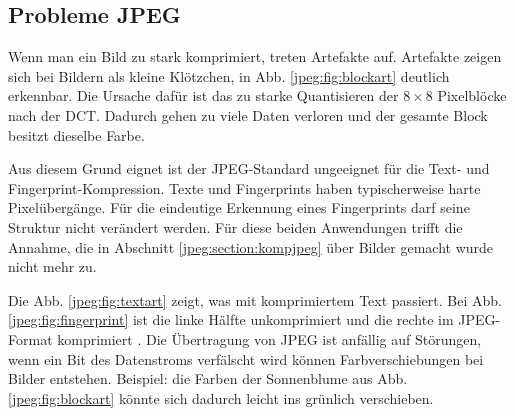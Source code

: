 \subsection{Probleme JPEG
\label{jpeg:subsection:probleme}}
Wenn man ein Bild zu stark komprimiert, treten Artefakte auf.
Artefakte zeigen sich bei Bildern als kleine Klötzchen, in Abb. \ref{jpeg:fig:blockart} deutlich erkennbar.
Die Ursache dafür ist das zu starke Quantisieren der \(8\times8\) Pixelblöcke nach der DCT.
Dadurch gehen zu viele Daten verloren und der gesamte Block besitzt dieselbe Farbe.

Aus diesem Grund eignet ist der JPEG-Standard ungeeignet für die Text- und Fingerprint-Kompression.
Texte und Fingerprints haben typischerweise harte Pixelübergänge.
Für die eindeutige Erkennung eines Fingerprints darf seine Struktur nicht verändert werden.
Für diese beiden Anwendungen trifft die Annahme, die in Abschnitt \ref{jpeg:section:kompjpeg} über Bilder gemacht wurde nicht mehr zu.

Die Abb. \ref{jpeg:fig:textart} zeigt, was mit komprimiertem Text passiert.
Bei Abb. \ref{jpeg:fig:fingerprint} ist die linke Hälfte unkomprimiert und die rechte im JPEG-Format komprimiert .
Die Übertragung von JPEG ist anfällig auf Störungen, wenn ein Bit des Datenstroms verfälscht wird können Farbverschiebungen bei Bilder entstehen.
Beispiel: die Farben der Sonnenblume aus Abb. \ref{jpeg:fig:blockart} könnte sich dadurch leicht ins grünlich verschieben.


